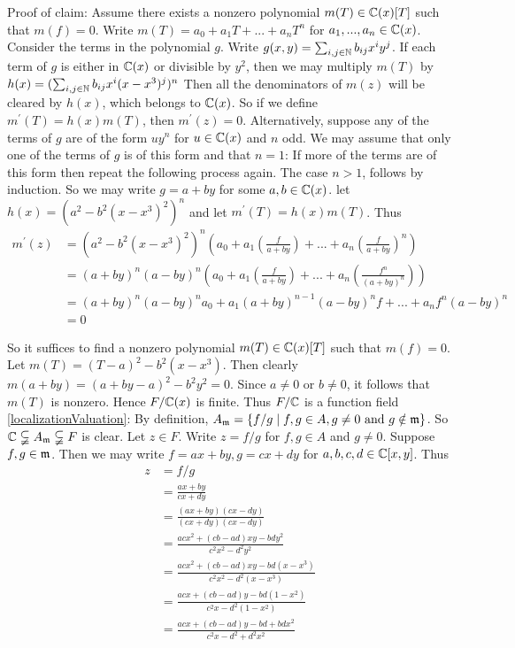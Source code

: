 \begin{solution}
	Proof of claim:
	Assume there exists a nonzero polynomial $m(T) \in \mathbb{C}(x)[T]$ 
	such that $m(f) = 0$. Write $m(T) = a_0 + a_1T + ... + a_nT^n$ 
	for $a_1,...,a_n \in \mathbb{C}(x)$. Consider the terms in the polynomial $g$.
	Write $g(x,y) = \sum_{i,j\in \mathbb{N} } b_{ij} x^iy^j$. 
	If each term of $g$ is either in $\mathbb{C}(x)$ or divisible by $y^2$,
	then we may multiply $m(T)$ by $h(x) = (\sum_{i,j\in \mathbb{N} } b_{ij} x^i(x-x^3)^j)^n$
	Then all the denominators of $m(z)$ will be cleared by $h(x)$, which 
	belongs to $\mathbb{C}(x)$. So if we define $m^{\prime}(T) = h(x)m(T)$,
	then $m^{\prime} (z) = 0$. Alternatively, suppose any of the terms
	of $g$ are of the form $uy^n$ for $u\in \mathbb{C}(x)$ and $n$ odd.
	We may assume that only one of the terms of $g$ is of this form 
	and that $n = 1$: If more of the terms are of this form then 
	repeat the following process again. 
	The case $n > 1 $, follows by induction. So we may write
	$g = a + by$ for some $a,b \in \mathbb{C}(x)$. let $h(x) = (a^2 - b^2(x-x^3)^2)^n$ and 
	let $m^{\prime}(T) = h(x)m(T)$. 
	Thus
	\begin{align*}
		m^{\prime}(z) &= (a^2 - b^2(x-x^3)^2)^n(a_0 + a_1(\frac{f}{a+by}) + ... + a_n(\frac{f}{a+by})^n) \\
		&= (a+by)^n(a-by)^n (a_0 + a_1(\frac{f}{a+by}) + ... + a_n(\frac{f^n}{(a+by)^n})) \\
		&= (a+by)^n(a-by)^na_0 + a_1(a+by)^{n-1}(a-by)^nf + ... + a_nf^n(a-by)^n \\
		&= 0  
	\end{align*}

	So it suffices to find a nonzero polynomial $m(T) \in \mathbb{C} (x)[T]$
	such that $m(f) = 0$. Let $m(T) = (T-a)^{2} - b^2(x-x^3)$. Then 
	clearly $m(a+by) = (a+by - a)^2 - b^2y^2 = 0$. Since $a \neq 0 $ 
	or $b \neq 0$, it follows that $m(T)$ is nonzero. Hence
	$F/\mathbb{C}(x)$ is finite. Thus $F/\mathbb{C}$ is a function field \\

	\eqref{localizationValuation}: By definition, 
	$A_{\mathfrak{m}} = \lbrace f/g \mid f,g \in A , g \neq 0 \text{ and } g \notin \mathfrak{m} \rbrace $.
	So $\mathbb{C} \subsetneqq A_{\mathfrak{m}} \subsetneqq F$ is clear. Let $z \in F$. 
	Write $z = f/g$ for $f,g \in A$ and $g \neq 0$. Suppose $f,g \in \mathfrak{m}$. 
	Then we may write $f = ax+by,g = cx + dy$ for $a,b,c,d \in \mathbb{C}[x,y]$.
	Thus
	\begin{align*}
		z &= f/g \\
		&= \frac{ax+by}{cx + dy} \\
		&= \frac{(ax+by)(cx - dy)}{(cx + dy)(cx - dy)} \\
		&= \frac{acx^2 + (cb-ad)xy - bdy^2}{c^2x^2 -d^2y^2} \\
		&= \frac{acx^2 + (cb-ad)xy - bd(x-x^3)}{c^2x^2 -d^2(x-x^3)} \\
		&= \frac{acx + (cb-ad)y - bd(1-x^2)}{c^2x -d^2(1-x^2)} \\
		&= \frac{acx + (cb-ad)y - bd + bdx^2}{c^2x -d^2 + d^2x^2} 
	\end{align*}


\end{solution}
